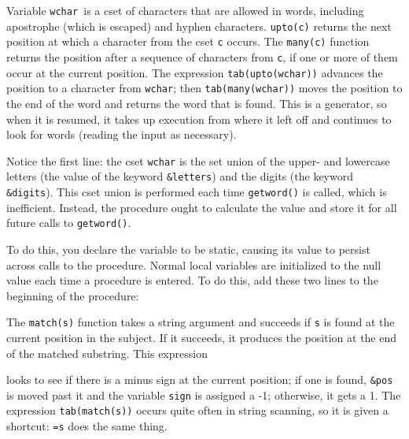 Variable \texttt{wchar}\texttt{ }is a cset of characters that are
allowed in words, including apostrophe (which is escaped) and hyphen
characters. \texttt{upto(c)} returns the next position
at which a character from the cset \texttt{c} occurs. The
\texttt{many(c)} function returns the position after a
sequence of characters from \texttt{c}, if one or more of them occur at
the current position. The expression \texttt{tab(upto(wchar))} advances
the position to a character from \texttt{wchar}; then
\texttt{tab(many(wchar))} moves the position to the end of the word and
returns the word that is found. This is a generator, so when it is
resumed, it takes up execution from where it left off and continues to
look for words (reading the input as necessary).

Notice the first line: the cset \texttt{wchar} is the set union of the
upper- and lowercase letters (the value of the keyword
\texttt{\&letters}) and the digits (the keyword \texttt{\&digits}).
This cset union is performed each time \texttt{getword()} is called,
which is inefficient. Instead, the procedure ought to calculate the
value and store it for all future calls to \texttt{getword()}.

To do this, you declare the variable to be static, causing its value to
persist across calls to the procedure. Normal local variables are
initialized to the null value each time a procedure is entered. To do
this, add these two lines to the beginning of the procedure:


The \texttt{match(s)} function takes a string argument
and succeeds if \texttt{s} is found at the current position in the
subject. If it succeeds, it produces the position at the end of the
matched substring. This expression


\noindent
looks to see if there is a minus sign at the current position; if one is
found, \texttt{\&pos} is moved past it and the variable \texttt{sign}
is assigned a -1; otherwise, it gets a 1. The expression
\texttt{tab(match(s))} occurs quite often in string scanning, so it is
given a shortcut: \texttt{=s} does the same thing.

